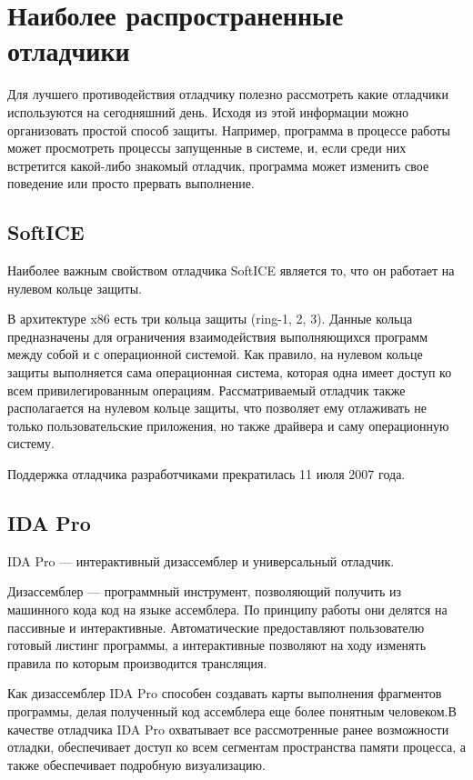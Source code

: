 
\section{Наиболее распространенные отладчики}
Для лучшего противодействия отладчику полезно рассмотреть какие отладчики
используются на сегодняшний день. Исходя из этой информации можно организовать
простой способ защиты. Например, программа в процессе работы может просмотреть
процессы запущенные в системе, и, если среди них встретится какой-либо знакомый
отладчик, программа может изменить свое поведение или просто прервать
выполнение.

\subsection{SoftICE}
Наиболее важным свойством отладчика SoftICE является то, что он работает на
нулевом кольце защиты.

В архитектуре x86 есть три кольца защиты (ring-1, 2, 3).
Данные кольца предназначены для ограничения взаимодействия выполняющихся
программ между собой и с операционной системой. Как правило, на нулевом кольце
защиты выполняется сама операционная система, которая одна имеет доступ ко всем
привилегированным операциям. Рассматриваемый отладчик также располагается на
нулевом кольце защиты, что позволяет ему отлаживать не только пользовательские
приложения, но также драйвера и саму операционную систему.

Поддержка отладчика разработчиками прекратилась 11 июля 2007 года.

\subsection{IDA Pro}
IDA Pro --- интерактивный дизассемблер и универсальный отладчик. 

Дизассемблер --- программный инструмент, позволяющий получить из машинного кода
код на языке ассемблера. По принципу работы они делятся на пассивные и
интерактивные. Автоматические предоставляют пользователю готовый листинг
программы, а интерактивные позволяют на ходу изменять правила по которым
производится трансляция.

Как дизассемблер IDA Pro способен создавать карты выполнения фрагментов
программы, делая полученный код ассемблера еще более понятным человеком.В
качестве отладчика IDA Pro охватывает все рассмотренные ранее возможности
отладки, обеспечивает доступ ко всем сегментам пространства памяти процесса, а
также обеспечивает подробную визуализацию.

